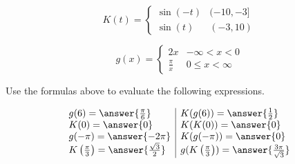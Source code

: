\documentclass{ximera}
\author{Lee Wayand}
\begin{document}
\begin{exercise}





\[
K(t) = 
\begin{cases}
  \sin(-t) &  (-10, -3]   \\
  \sin(t) & (-3, 10)
\end{cases}
\]





\[
g(x) = 
\begin{cases}
  2x  &   -\infty < x < 0 \\
  \frac{\pi}{x} &  0 \leq x < \infty
\end{cases}
\]



\begin{question}



Use the formulas above to evaluate the following expressions.



\[
\begin{array}{l|l}
g(6) = \answer{\frac{\pi}{6}}  & K(g(6)) = \answer{\frac{1}{2}}   \\
K(0) = \answer{0}  & K(K(0)) = \answer{0}   \\
g(-\pi) = \answer{-2 \pi}  & K(g(-\pi)) = \answer{0}   \\
K \left(\frac{\pi}{3} \right) = \answer{\frac{\sqrt{3}}{2}}  & g(K \left(\frac{\pi}{3} \right)) = \answer{\frac{3 \pi}{\sqrt{3}}}   \\

\end{array}
\]




\end{question}














\end{exercise}
\end{document}
